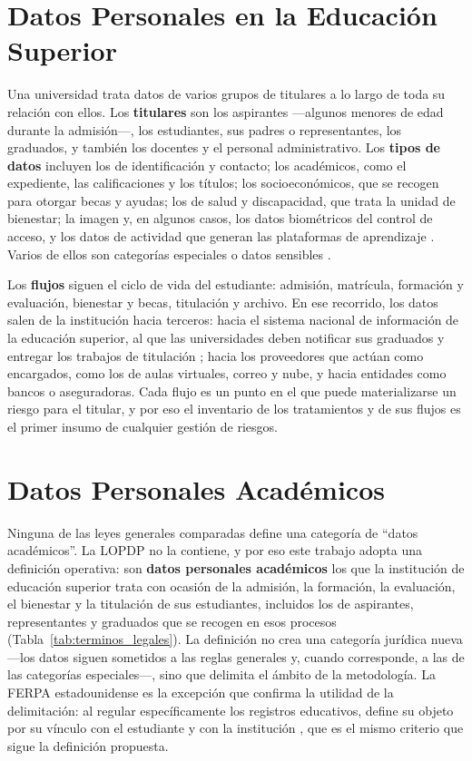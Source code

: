 \section{Datos Personales en la Educación Superior}
\label{sec:datos_es}

Una universidad trata datos de varios grupos de titulares a lo largo de toda su relación con ellos. Los \textbf{titulares} son los aspirantes ---algunos menores de edad durante la admisión---, los estudiantes, sus padres o representantes, los graduados, y también los docentes y el personal administrativo. Los \textbf{tipos de datos} incluyen los de identificación y contacto; los académicos, como el expediente, las calificaciones y los títulos; los socioeconómicos, que se recogen para otorgar becas y ayudas; los de salud y discapacidad, que trata la unidad de bienestar; la imagen y, en algunos casos, los datos biométricos del control de acceso, y los datos de actividad que generan las plataformas de aprendizaje \cite{liu2023privacy,garcia2023moodle}. Varios de ellos son categorías especiales o datos sensibles \cite[arts.~4 y 25]{lopdp2021}.

Los \textbf{flujos} siguen el ciclo de vida del estudiante: admisión, matrícula, formación y evaluación, bienestar y becas, titulación y archivo. En ese recorrido, los datos salen de la institución hacia terceros: hacia el sistema nacional de información de la educación superior, al que las universidades deben notificar sus graduados y entregar los trabajos de titulación \cite[arts.~129 y 144]{loes2010}; hacia los proveedores que actúan como encargados, como los de aulas virtuales, correo y nube, y hacia entidades como bancos o aseguradoras. Cada flujo es un punto en el que puede materializarse un riesgo para el titular, y por eso el inventario de los tratamientos y de sus flujos es el primer insumo de cualquier gestión de riesgos.

\section{Datos Personales Académicos}
\label{sec:datos_academicos}

Ninguna de las leyes generales comparadas define una categoría de ``datos académicos''. La LOPDP no la contiene, y por eso este trabajo adopta una definición operativa: son \textbf{datos personales académicos} los que la institución de educación superior trata con ocasión de la admisión, la formación, la evaluación, el bienestar y la titulación de sus estudiantes, incluidos los de aspirantes, representantes y graduados que se recogen en esos procesos (Tabla~\ref{tab:terminos_legales}). La definición no crea una categoría jurídica nueva ---los datos siguen sometidos a las reglas generales y, cuando corresponde, a las de las categorías especiales---, sino que delimita el ámbito de la metodología. La FERPA estadounidense es la excepción que confirma la utilidad de la delimitación: al regular específicamente los registros educativos, define su objeto por su vínculo con el estudiante y con la institución \cite{ferpa1974,ferpa34cfr}, que es el mismo criterio que sigue la definición propuesta.

